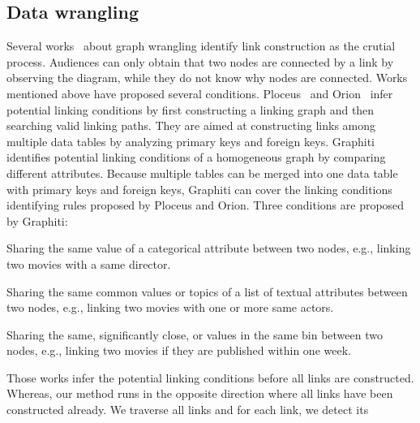 \subsection{Data wrangling}
Several works~\cite{DBLP:journals/ivs/LiuNS14, DBLP:journals/ivs/HeerP14, DBLP:journals/tvcg/SrinivasanPEB18} about graph wrangling identify link construction as the crutial process.
Audiences can only obtain that two nodes are connected by a link by observing the diagram, while they do not know why nodes are connected.
Works mentioned above have proposed several conditions.
Ploceus~\cite{DBLP:journals/ivs/LiuNS14} and Orion~\cite{DBLP:journals/ivs/HeerP14} infer potential linking conditions by first constructing a linking graph and then searching valid linking paths. They are aimed at constructing links among multiple data tables by analyzing primary keys and foreign keys.
Graphiti~\cite{DBLP:journals/tvcg/SrinivasanPEB18} identifies potential linking conditions of a homogeneous graph by comparing different attributes.
Because multiple tables can be merged into one data table with primary keys and foreign keys, Graphiti can cover the linking conditions identifying rules proposed by Ploceus and Orion. %
Three conditions are proposed by Graphiti:

\begin{compactenum}
    \item Sharing the same value of a categorical attribute between two nodes, e.g., linking two movies with a same director.
    \item Sharing the same common values or topics of a list of textual attributes between two nodes, e.g., linking two movies with one or more same actors. 
    \item Sharing the same, significantly close, or values in the same bin between two nodes, e.g., linking two movies if they are published within one week.
\end{compactenum}

Those works infer the potential linking conditions before all links are constructed. 
Whereas, our method runs in the opposite direction where all links have been constructed already.
We traverse all links and for each link, we detect its 

